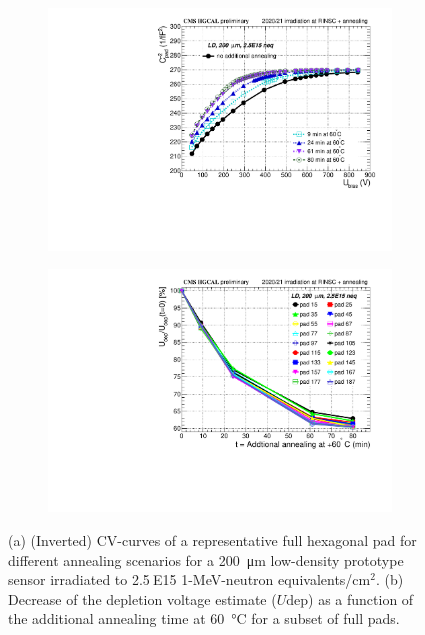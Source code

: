 \begin{figure}
	\captionsetup[subfigure]{aboveskip=-1pt,belowskip=-1pt}
	\centering
	\begin{subfigure}[b]{0.49\textwidth}
		\includegraphics[width=0.999\textwidth]{plots/annealing_Vdep/annealing_CV_ch24.pdf}
		\subcaption{
		}
		\label{plot:annealing_CV}
	\end{subfigure}
	\hfill
	\begin{subfigure}[b]{0.49\textwidth}
		\includegraphics[width=0.999\textwidth]{plots/annealing_Vdep/annealing_Vdep.pdf}
		\subcaption{
		}
		\label{plot:annealing_Vdep}
	\end{subfigure}
	\caption{
		(a) (Inverted) CV-curves of a representative full hexagonal pad for different annealing scenarios for a \SI{200}{\micro\metre} low-density prototype sensor irradiated to 2.5$~$E15 1-MeV-neutron equivalents/cm$^{2}$.
        (b) Decrease of the depletion voltage estimate ($U\text{dep}$) as a function of the additional annealing time at \SI{60}{\celsius} for a subset of full pads.
	}
\end{figure}